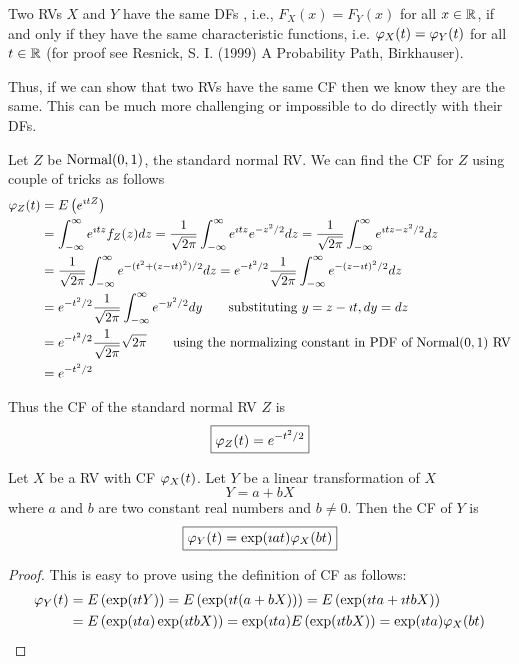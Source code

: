 Two RVs $X$ and $Y$ have the same DFs , i.e., $F_X(x) = F_Y(x)$ for all $x \in \mathbb{R}$, if and only if they have the same characteristic functions, i.e. $\varphi_X(t) = \varphi_Y(t)$ for all $t \in \mathbb{R}$ (for proof see Resnick, S. I. (1999) A Probability Path, Birkhauser). 

Thus, if we can show that two RVs have the same CF then we know they are the same.  This can be much more challenging or impossible to do directly with their DFs.

Let $Z$ be $\mbox{{\rm Normal}}(0,1)$, the standard normal RV.
We can find the CF for $Z$ using couple of tricks as follows
\begin{align*}
\varphi_Z(t)
&= E\left(e^{\imath t Z} \right)\\
&= \int_{-\infty}^{\infty} e^{\imath t z} f_Z(z) dz = \frac{1}{\sqrt{2 \pi}} \int_{-\infty}^{\infty} e^{\imath t z} e^{-z^2/2} dz = \frac{1}{\sqrt{2 \pi}} \int_{-\infty}^{\infty} e^{\imath t z -z^2/2} dz \\
&= \frac{1}{\sqrt{2 \pi}} \int_{-\infty}^{\infty} e^{-(t^2 + (z - \imath t)^2)/2} dz = e^{-t^2/2} \frac{1}{\sqrt{2 \pi}} \int_{-\infty}^{\infty} e^{ -(z - \imath t)^2/2} dz \\
&= e^{-t^2/2} \frac{1}{\sqrt{2 \pi}} \int_{-\infty}^{\infty} e^{ -y^2/2} dy  \qquad \text{substituting $y=z-\imath t, dy=dz$}\\
&= e^{-t^2/2} \frac{1}{\sqrt{2 \pi}} \sqrt{2 \pi}  \qquad \text{using the normalizing constant in PDF of $\mbox{{\rm Normal}}(0,1)$ RV}\\
&= e^{-t^2/2}
\end{align*}

Thus the CF of the standard normal RV $Z$ is
\begin{equation}\label{E:cfStandardNormal}
\boxed{
\varphi_Z(t) = e^{-t^2/2}
}
\end{equation}


Let $X$ be a RV with CF $\varphi_X(t)$.  Let $Y$ be a linear transformation of $X$
\[
Y= a + bX
\]
where $a$ and $b$ are two constant real numbers and $b \neq 0$.  
Then the CF of $Y$ is
\begin{equation}\label{E:cfofLinearTransformation}
\boxed{
\varphi_Y(t) = \exp(\imath a t) \varphi_X(b t)
}
\end{equation}

\begin{proof}
This is easy to prove using the definition of CF as follows:
\begin{align*}
\varphi_Y(t)
&= E\left(\exp(\imath t Y) \right)
= E\left(\exp(\imath t (a + bX) ) \right)
= E\left(\exp(\imath t a + \imath t b X) \right)\\
&= E\left(\exp(\imath t a) \exp(\imath t b X) \right)
= \exp(\imath t a) E\left( \exp(\imath t b X) \right)
= \exp(\imath t a) \varphi_X(b t)
\end{align*}
\end{proof}

